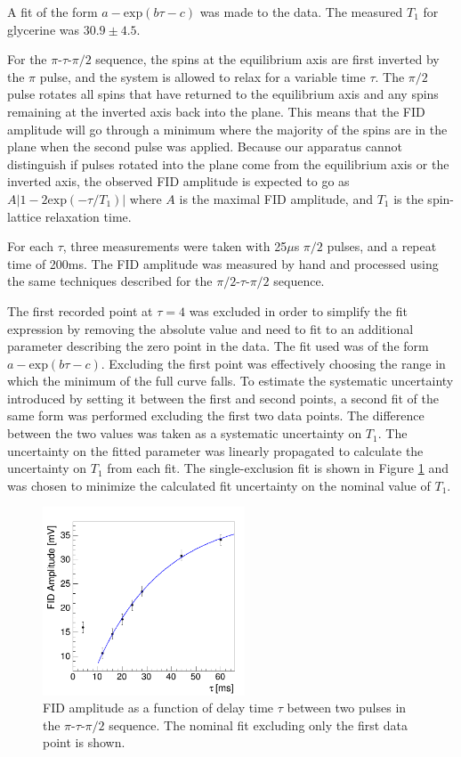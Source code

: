 A fit of the form $a-\mathrm{exp}(b\tau-c)$ was made to the data. The measured $T_1$ for glycerine was $30.9\pm4.5$. 

For the $\pi$-$\tau$-$\pi/2$ sequence, the spins at the equilibrium axis are first inverted by the $\pi$ pulse, and the system is allowed to relax for a variable time $\tau$. The $\pi/2$ pulse rotates all spins that have returned to the equilibrium axis and any spins remaining at the inverted axis back into the plane. This means that the FID amplitude will go through a minimum where the majority of the spins are in the plane when the second pulse was applied. Because our apparatus cannot distinguish if pulses rotated into the plane come from the equilibrium axis or the inverted axis, the observed FID amplitude is expected to go as $A|1-2\mathrm{exp}(-\tau/T_{1})|$ where $A$ is the maximal FID amplitude, and $T_{1}$ is the spin-lattice relaxation time.

For each $\tau$, three measurements were taken with 25$\mu$s $\pi/2$ pulses, and a repeat time of 200ms. The FID amplitude was measured by hand and processed using the same techniques described for the $\pi/2$-$\tau$-$\pi/2$ sequence. 

The first recorded point at $\tau=4$ was excluded in order to simplify the fit expression by removing the absolute value and need to fit to an additional parameter describing the zero point in the data. The fit used was of the form $a-\mathrm{exp}(b\tau-c)$. Excluding the first point was effectively choosing the range in which the minimum of the full curve falls. To estimate the systematic uncertainty introduced by setting it between the first and second points, a second fit of the same form was performed excluding the first two data points. The difference between the two values was taken as a systematic uncertainty on $T_{1}$. The uncertainty on the fitted parameter was linearly propagated to calculate the uncertainty on $T_{1}$ from each fit. The single-exclusion fit is shown in Figure \ref{fig:18090} and was chosen to minimize the calculated fit uncertainty on the nominal value of $T_{1}$.

\begin{figure}[htb]
\includegraphics[width=6cm]{images/t1_180t90.png}
\caption{FID amplitude as a function of delay time $\tau$ between two pulses in the $\pi$-$\tau$-$\pi/2$ sequence. The nominal fit excluding only the first data point is shown.}
\label{fig:18090}
\end{figure}


